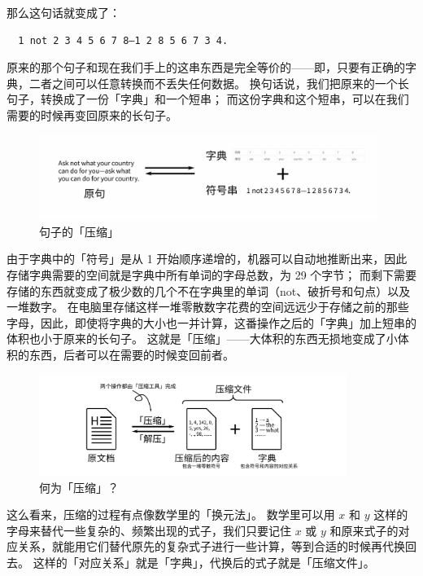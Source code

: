 那么这句话就变成了：

\begin{verbatim}
  1 not 2 3 4 5 6 7 8—1 2 8 5 6 7 3 4.
\end{verbatim}

原来的那个句子和现在我们手上的这串东西是完全等价的——即，只要有正确的字典，二者之间可以任意转换而不丢失任何数据。
换句话说，我们把原来的一个长句子，转换成了一份「字典」和一个短串；
而这份字典和这个短串，可以在我们需要的时候再变回原来的长句子。

\begin{figure}[htb!]
  \centering
  \includegraphics[width=11cm]{assets/Sentence_to_Dict.jpg}
  \caption{句子的「压缩」}
  \label{Sentence_to_Dict}
\end{figure}

由于字典中的「符号」是从 1 开始顺序递增的，机器可以自动地推断出来，因此存储字典需要的空间就是字典中所有单词的字母总数，为 29 个字节；
而剩下需要存储的东西就变成了极少数的几个不在字典里的单词（not、破折号和句点）以及一堆数字。
在电脑里存储这样一堆零散数字花费的空间远远少于存储之前的那些字母，因此，即使将字典的大小也一并计算，这番操作之后的「字典」加上短串的体积也小于原来的长句子。
这就是「压缩」——大体积的东西无损地变成了小体积的东西，后者可以在需要的时候变回前者。

\begin{figure}[htb!]
  \centering
  \includegraphics[width=10cm]{assets/Compressing.png}
  \caption{何为「压缩」？}
  \label{Compressing}
\end{figure}

这么看来，压缩的过程有点像数学里的「换元法」。
数学里可以用 $x$ 和 $y$ 这样的字母来替代一些复杂的、频繁出现的式子，我们只要记住 $x$ 或 $y$ 和原来式子的对应关系，就能用它们替代原先的复杂式子进行一些计算，等到合适的时候再代换回去。
这样的「对应关系」就是「字典」，代换后的式子就是「压缩文件」。

